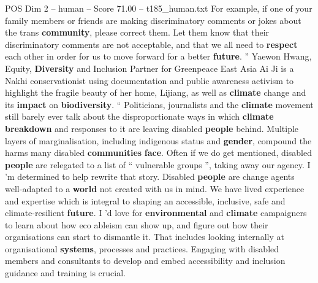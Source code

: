 \begin{textsample}{POS Dim 2 – human – Score 71.00 – t185\_human.txt}
For example, if one of your family members or friends are making discriminatory comments or jokes about the trans \textbf{community}, please correct them.
Let them know that their discriminatory comments are not acceptable, and that we all need to \textbf{respect} each other in order for us to move forward for a better \textbf{future}. ” Yaewon Hwang, Equity, \textbf{Diversity} and Inclusion Partner for Greenpeace East Asia Ai Ji is a Nakhi conservationist using documentation and public awareness activism to highlight the fragile beauty of her home, Lijiang, as well as \textbf{climate} change and its \textbf{impact} on \textbf{biodiversity}. “ Politicians, journalists and the \textbf{climate} movement still barely ever talk about the disproportionate ways in which \textbf{climate} \textbf{breakdown} and responses to it are leaving disabled \textbf{people} behind.
Multiple layers of marginalisation, including indigenous status and \textbf{gender}, compound the harms many disabled \textbf{communities} \textbf{face}.
Often if we do get mentioned, disabled \textbf{people} are relegated to a list of “ vulnerable groups ”, taking away our agency.
I ’m determined to help rewrite that story.
Disabled \textbf{people} are change agents well-adapted to a \textbf{world} not created with us in mind.
We have lived experience and expertise which is integral to shaping an accessible, inclusive, safe and climate-resilient \textbf{future}.
I ’d love for \textbf{environmental} and \textbf{climate} campaigners to learn about how eco ableism can show up, and figure out how their organisations can start to dismantle it.
That includes looking internally at organisational \textbf{systems}, processes and practices.
Engaging with disabled members and consultants to develop and embed accessibility and inclusion guidance and training is crucial.

\end{textsample}
